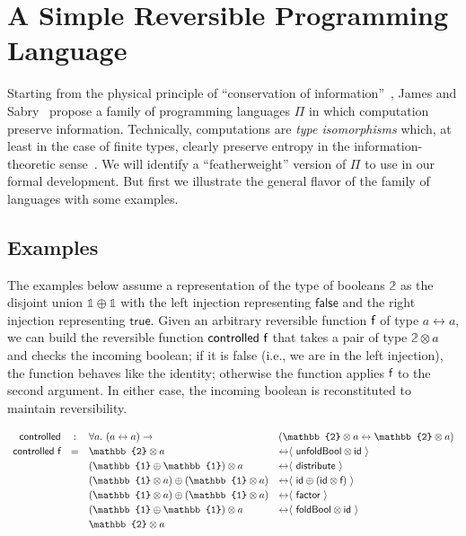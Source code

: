 \documentclass{entcs}
\newcommand{\byiso}[1]{{\leftrightarrow}{\langle} ~#1~ \rangle}
\newcommand{\ot}{\mathbb{1}}
\newcommand{\bt}{\mathbb{2}}
\begin{document}
\section{A Simple Reversible Programming Language}

Starting from the physical principle of ``conservation of
information''~\cite{Hey:1999:FCE:304763,fredkin1982conservative}, James and
Sabry~\cite{James:2012:IE:2103656.2103667} propose a family of programming
languages $\Pi$ in which computation preserve information. Technically,
computations are \emph{type isomorphisms} which, at least in the case of finite
types, clearly preserve entropy in the information-theoretic
sense~\cite{James:2012:IE:2103656.2103667}. We will identify a ``featherweight''
version of $\Pi$ to use in our formal development.  But first we illustrate the
general flavor of the family of languages with some examples.

\subsection{Examples}

The examples below assume a representation of the type of booleans
$\bt$ as the disjoint union $\ot \oplus \ot$ with the left injection
representing $\mathsf{false}$ and the right injection representing
$\mathsf{true}$. Given an arbitrary reversible function
$\AgdaFunction{f}$ of type $a \leftrightarrow a$, we can build the
reversible function $\AgdaFunction{controlled}~\AgdaFunction{f}$ that
takes a pair of type $\bt \otimes a$ and checks the incoming boolean;
if it is false (i.e., we are in the left injection), the function
behaves like the identity; otherwise the function applies
$\AgdaFunction{f}$ to the second argument. In either case, the
incoming boolean is reconstituted to maintain reversibility. 

{\small
\[\def\arraystretch{1.2}\begin{array}{rcll}
\AgdaFunction{controlled}  &:& \forall a.~ (a \leftrightarrow a) \rightarrow 
                            & (\bt \otimes a \leftrightarrow \bt \otimes a) \\
\AgdaFunction{controlled}~\AgdaFunction{f} &=& 

  \bt \otimes a 
    & \byiso{\AgdaFunction{unfoldBool} \otimes \AgdaFunction{id}} \\
&& (\ot \oplus \ot) \otimes a 
    & \byiso{\AgdaFunction{distribute}} \\
&& (\ot \otimes a) \oplus (\ot \otimes a) 
    & \byiso{\AgdaFunction{id} \oplus (\AgdaFunction{id} \otimes \AgdaFunction{f})} \\
&& (\ot \otimes a) \oplus (\ot \otimes a)
    & \byiso{\AgdaFunction{factor}} \\
&& (\ot \oplus \ot) \otimes a
    & \byiso{\AgdaFunction{foldBool} \otimes \AgdaFunction{id}} \\
&& \bt \otimes a & ~ \\
\end{array}
\]}
\end{document}
